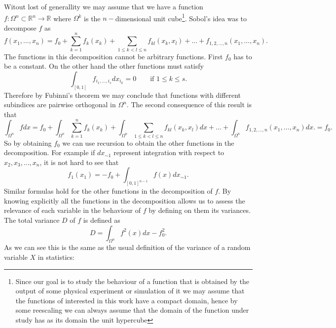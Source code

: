 \documentclass[12pt]{book}
\begin{document}
Witout lost of generallity we may assume that we have a function 
$f: \Omega^{n}\subset\mathbb{R}^{n}\longrightarrow \mathbb{R}$ where $\Omega^{k}$ is the $n-$dimensional
unit cube\footnote{Since our goal is to study the behaviour of a function that is obtained by the output
of some physical experiment or simulation of it we may assume that the functions of interested in this 
work have a compact domain, hence by some reescaling we can always assume that the domain of the function
under study has as its domain the unit hypercube}. Sobol's idea was to decompose $f$ as 
\begin{equation*}
f(x_{1},\ldots,x_{n})=f_{0}+\sum_{k=1}^{n}f_{k}(x_{k})+\sum_{1\leq k< l\leq n}f_{kl}(x_{k},x_{l})+\ldots+
f_{1,2,\ldots,n}(x_{1},\ldots,x_{n}).
\end{equation*}
The functions in this decomposition cannot be arbitrary functions. First $f_{0}$ has to be a constant.
On the other hand the other functions must satisfy
\begin{equation*}
\int_{[0,1]}f_{i_{1},\ldots,i_{s}}dx_{i_{k}}=0\qquad\text{if } 1\leq k\leq s.
\end{equation*} 
Therefore by Fubinni's theorem we may conclude that functions with different subindices are 
 pairwise orthogonal in $\Omega^{n}$. The second consequence of this result is that
\begin{equation*}
\int_{\Omega^{n}}fdx=f_{0}+\int_{\Omega^{n}}\sum_{k=1}^{n}f_{k}(x_{k})+
\int_{\Omega^{n}}\sum_{1\leq k< l\leq n}f_{kl}(x_{k},x_{l})dx+\ldots+
\int_{\Omega^{n}}f_{1,2,\ldots,n}(x_{1},\ldots,x_{n})dx.=f_{0}.
\end{equation*}
So by obtaining $f_{0}$ we can use recursion to obtain the other functions in the decomposition. For example
if $dx_{\sim 1}$ represent integration with respect to $x_{2},x_{3},\ldots, x_{n}$, it is not 
hard to see that 
\begin{equation*}
f_{1}(x_{1})=-f_{0}+\int_{[0,1]^{n-1}}f(x)dx_{\sim 1}.
\end{equation*}
Similar formulas hold for the other functions in  the decomposition of $f$. By knowing explicitly all
the functions in the decomposition allows us to assess the relevance of each variable in the 
behaviour of $f$ by defining on them its variances. The total variance $D$ of $f$ is defined as
\begin{equation*}
D=\int_{\Omega^{n}}f^{2}(x)dx-f_{0}^{2}.
\end{equation*}
As we can see this is the same as the usual definition of the variance of a random variable $X$  in statistics: 
\end{document}
